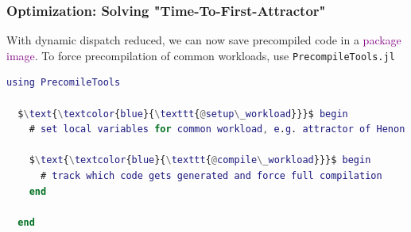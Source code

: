 \documentclass[
  english,            %
  aspectratio=169,    %
]{tumbeamer}
\renewcommand{\emph}[1]{\textcolor{purple}{#1}}
\begin{document}
\begin{frame}[fragile]
\frametitle{Optimization: Solving "Time-To-First-Attractor"}

With dynamic dispatch reduced, we can now save precompiled code in a \emph{package image}. To force precompilation of common workloads, use \texttt{PrecompileTools.jl}

\medskip

\begin{lstlisting}[language=Matlab,mathescape]
  using PrecomileTools

  $\text{\textcolor{blue}{\texttt{@setup\_workload}}}$ begin
    # set local variables for common workload, e.g. attractor of Henon map

    $\text{\textcolor{blue}{\texttt{@compile\_workload}}}$ begin
      # track which code gets generated and force full compilation
    end

  end
\end{lstlisting}

\end{frame}
\end{document}
